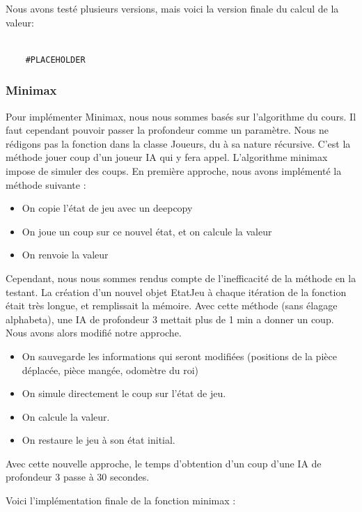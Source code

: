 \documentclass{article}
\begin{document}
Nous avons testé plusieurs versions, mais voici la version finale du calcul de la valeur:  
\begin{verbatim}

    #PLACEHOLDER
\end{verbatim}

\subsubsection{Minimax}
Pour implémenter Minimax, nous nous sommes basés sur l'algorithme du cours.
Il faut cependant pouvoir passer la profondeur comme un paramètre.
Nous ne rédigons pas la fonction dans la classe Joueurs, du à sa nature récursive.
C'est la méthode jouer coup d'un joueur IA qui y fera appel.
L'algorithme minimax impose de simuler des coups.
En première approche, nous avons implémenté la méthode suivante : \\
\begin{itemize}
    \item On copie l'état de jeu avec un deepcopy 
    \item On joue un coup sur ce nouvel état, et on calcule la valeur
    \item On renvoie la valeur
\end{itemize}

Cependant, nous nous sommes rendus compte de l'inefficacité de la méthode en la testant.
La création d'un nouvel objet EtatJeu à chaque itération de la fonction était très longue,
et remplissait la mémoire. Avec cette méthode (sans élagage alpha\-beta), une IA de profondeur 3
mettait plus de 1 min a donner un coup. \\

Nous avons alors modifié notre approche.
\begin{itemize}
    \item On sauvegarde les informations qui seront modifiées (positions de la pièce déplacée, pièce mangée, odomètre du roi)
    \item On simule directement le coup sur l'état de jeu.
    \item On calcule la valeur.
    \item On restaure le jeu à son état initial.
\end{itemize}
Avec cette nouvelle approche, le temps d'obtention d'un coup d'une IA de profondeur 3 passe à 30 secondes.

Voici l'implémentation finale de la fonction minimax :
\end{document}
